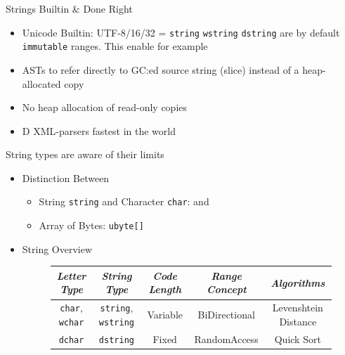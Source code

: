 \documentclass[xcolor=dvipsnames]{beamer}
\begin{document}
\begin{frame}[fragile]{Strings Builtin \& Done Right}
  \begin{itemize}[<+->]
  \item Unicode Builtin: UTF-8/16/32 = \texttt{string} \texttt{wstring}
    \texttt{dstring} are by default \texttt{immutable} ranges. This enable for
    example
  \item ASTs to refer directly to GC:ed source string (slice) instead of a
    heap-allocated copy
  \item No heap allocation of read-only copies
  \item D XML-parsers fastest in the world
  \end{itemize}
\end{frame}

\begin{frame}[fragile]{String types are aware of their limits}
  \begin{itemize}[<+->]
  \item Distinction Between
    \begin{itemize}[<+->]
    \item String \texttt{string} and Character \texttt{char}:  and
    \item Array of Bytes: \texttt{ubyte[]}
    \end{itemize}
  \item String Overview
  \begin{figure}
  \tiny
  \begin{tabular}{ c | c | c | c | c }
    \textit{Letter Type} & \textit{String Type} & \textit{Code Length} & \textit{Range Concept} & \textit{Algorithms} \\
    \hline
    \texttt{char}, \texttt{wchar} & \texttt{string}, \texttt{wstring} & Variable & BiDirectional & Levenshtein Distance\\
    \hline
    \texttt{dchar} & \texttt{dstring} & Fixed & RandomAccess & Quick Sort\\
  \end{tabular}
  \end{figure}
  \end{itemize}
\end{frame}
\end{document}
